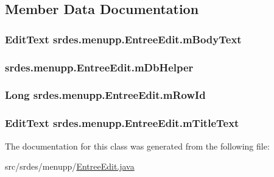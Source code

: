 \subsection{\-Member \-Data \-Documentation}
\hypertarget{classsrdes_1_1menupp_1_1_entree_edit_abcacd374ad79526bef01bccd36c3f5db}{
\subsubsection[{m\-Body\-Text}]{\setlength{\rightskip}{0pt plus 5cm}\-Edit\-Text {\bf srdes.\-menupp.\-Entree\-Edit.\-m\-Body\-Text}}}\label{classsrdes_1_1menupp_1_1_entree_edit_abcacd374ad79526bef01bccd36c3f5db}
\hypertarget{classsrdes_1_1menupp_1_1_entree_edit_a8991a77418ad85b136dcb2f36c904eb2}{
\subsubsection[{m\-Db\-Helper}]{ {\bf srdes.\-menupp.\-Entree\-Edit.\-m\-Db\-Helper}}}\label{classsrdes_1_1menupp_1_1_entree_edit_a8991a77418ad85b136dcb2f36c904eb2}
\hypertarget{classsrdes_1_1menupp_1_1_entree_edit_a2cce72da055bbe09877d4575008c70a2}{
\subsubsection[{m\-Row\-Id}]{\setlength{\rightskip}{0pt plus 5cm}\-Long {\bf srdes.\-menupp.\-Entree\-Edit.\-m\-Row\-Id}}}\label{classsrdes_1_1menupp_1_1_entree_edit_a2cce72da055bbe09877d4575008c70a2}
\hypertarget{classsrdes_1_1menupp_1_1_entree_edit_adcbb5bc937580270638ebfda4265cd11}{
\subsubsection[{m\-Title\-Text}]{\setlength{\rightskip}{0pt plus 5cm}\-Edit\-Text {\bf srdes.\-menupp.\-Entree\-Edit.\-m\-Title\-Text}}}\label{classsrdes_1_1menupp_1_1_entree_edit_adcbb5bc937580270638ebfda4265cd11}


\-The documentation for this class was generated from the following file\-:\begin{DoxyCompactItemize}
\item 
src/srdes/menupp/\hyperlink{_entree_edit_8java}{\-Entree\-Edit.\-java}\end{DoxyCompactItemize}
